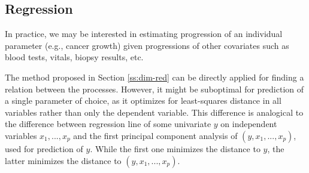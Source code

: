 \documentclass[preprint]{imsart}
\numberwithin{equation}{section}
\theoremstyle{plain}
\begin{document}

\subsection{Regression}\label{ss:regression}

In practice, we may be interested in estimating progression of an individual parameter (e.g., cancer growth) given progressions of other covariates such as blood tests, vitals, biopsy results, etc.

The method proposed in Section \ref{ss:dim-red} can be directly applied for finding a relation between the processes. However, it might be suboptimal for prediction of a single parameter of choice, as it optimizes for least-squares distance in all variables rather than only the dependent variable. This difference is analogical to the difference between regression line of some univariate $y$ on independent variables $x_1,...,x_p$ and the first principal component analysis of $(y,x_1,...,x_p)$, used for prediction of $y$. While the first one minimizes the distance to $y$, the latter minimizes the distance to $(y,x_1,...,x_p)$.
\end{document}
